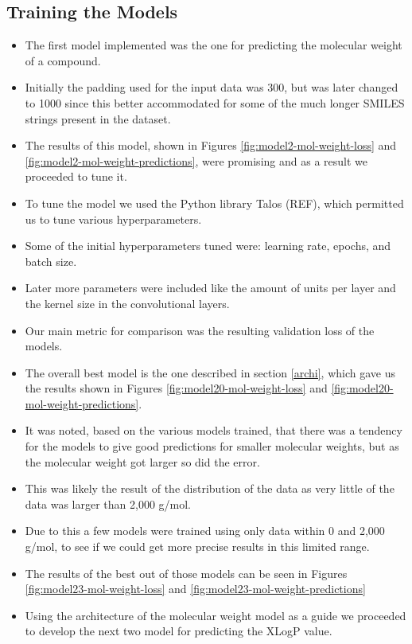     \subsection{Training the Models}
    \begin{itemize}
        \item The first model implemented was the one for predicting the molecular weight of a compound.
        \item Initially the padding used for the input data was 300, but was later changed to 1000 since this better accommodated for some of the much longer SMILES strings present in the dataset.
        \item The results of this model, shown in Figures \ref{fig:model2-mol-weight-loss} and \ref{fig:model2-mol-weight-predictions}, were promising and as a result we proceeded to tune it.
        \item To tune the model we used the Python library Talos (REF), which permitted us to tune various hyperparameters.
        \item Some of the initial hyperparameters tuned were: learning rate, epochs, and batch size. \item Later more parameters were included like the amount of units per layer and the kernel size in the convolutional layers.
        \item Our main metric for comparison was the resulting validation loss of the models.
        \item The overall best model is the one described in section \ref{archi}, which gave us the results shown in Figures \ref{fig:model20-mol-weight-loss} and \ref{fig:model20-mol-weight-predictions}.
        \item It was noted, based on the various models trained, that there was a tendency for the models to give good predictions for smaller molecular weights, but as the molecular weight got larger so did the error.
        \item This was likely the result of the distribution of the data as very little of the data was larger than 2,000 g/mol.
        \item Due to this a few models were trained using only data within 0 and 2,000 g/mol, to see if we could get more precise results in this limited range.
        \item The results of the best out of those models can be seen in Figures \ref{fig:model23-mol-weight-loss} and \ref{fig:model23-mol-weight-predictions}
        \item Using the architecture of the molecular weight model as a guide we proceeded to develop the next two model for predicting the XLogP value.

\end{itemize}
